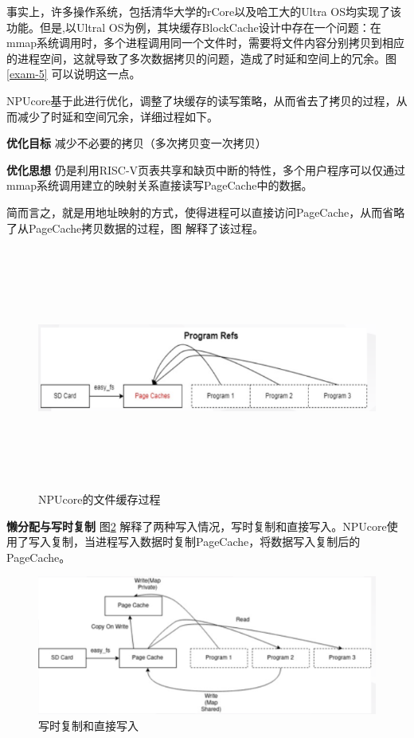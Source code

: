 事实上，许多操作系统，包括清华大学的rCore以及哈工大的Ultra OS均实现了该功能。但是,以Ultral OS为例，其块缓存BlockCache设计中存在一个问题：在mmap系统调用时，多个进程调用同一个文件时，需要将文件内容分别拷贝到相应的进程空间，这就导致了多次数据拷贝的问题，造成了时延和空间上的冗余。图\ref{exam-5} 可以说明这一点。

NPUcore基于此进行优化，调整了块缓存的读写策略，从而省去了拷贝的过程，从而减少了时延和空间冗余，详细过程如下。

\textbf{优化目标} \; 减少不必要的拷贝（多次拷贝变一次拷贝）

\textbf{优化思想} \; 仍是利用RISC-V页表共享和缺页中断的特性，多个用户程序可以仅通过mmap系统调用建立的映射关系直接读写PageCache中的数据。

简而言之，就是用地址映射的方式，使得进程可以直接访问PageCache，从而省略了从PageCache拷贝数据的过程，图 解释了该过程。

\begin{figure}[htbp]
	\centering
	\includegraphics[height=8cm]{figures/10-04/10-04-06.png}
	\caption{NPUcore的文件缓存过程}
	\label{exam-6}
\end{figure}

\textbf{懒分配与写时复制}\; 图\ref{exam-7} 解释了两种写入情况，写时复制和直接写入。NPUcore使用了写入复制，当进程写入数据时复制PageCache，将数据写入复制后的PageCache。

\begin{figure}[htbp]
	\centering
	\includegraphics[scale=0.6]{figures/10-04/10-04-07.png}
	\caption{写时复制和直接写入}
	\label{exam-7}
\end{figure}

